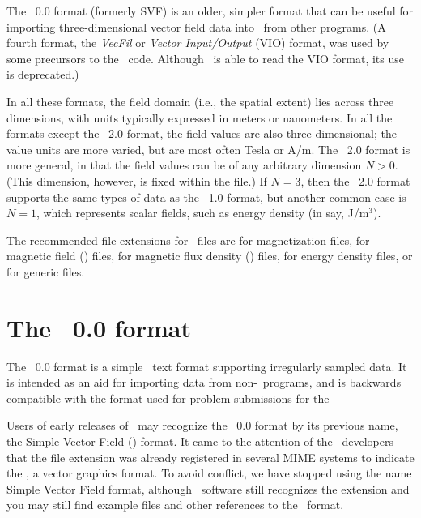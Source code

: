 The \OVF~0.0 format (formerly SVF)
is an older, simpler format that can be useful for importing
three-dimensional vector
field data into \OOMMF\ from other programs.  (A fourth format, the
\textit{VecFil} or \textit{Vector Input/Output}
(VIO) format, was used by some precursors to the \OOMMF\
code.  Although \OOMMF\ is able to read the VIO format, its use is
deprecated.)

In all these formats, the field domain (i.e., the spatial extent) lies
across three dimensions, with units typically expressed in meters or
nanometers.  In all the formats except the \OVF~2.0 format, the field
values are also three dimensional; the value units are more varied, but
are most often Tesla or A/m.  The \OVF~2.0 format is more general, in
that the field values can be of any arbitrary dimension $N>0$.  (This
dimension, however, is fixed within the file.)  If $N=3$, then the
\OVF~2.0 format supports the same types of data as the \OVF~1.0
format, but another common case is $N=1$, which represents scalar
fields, such as energy density (in say, J/m${}^3$).

The recommended file extensions for \OVF\ files are  for
magnetization files, \fn{.ohf} for magnetic field (\vH) files, 
for magnetic flux density (\vB) files,  \fn{.oef} for energy density
files, or \fn{.ovf} for generic files.

\section{The \OVF\ 0.0 format}\label{sec:svfformat}
The \OVF\ 0.0 format is a simple \ASCII\ text
format supporting irregularly sampled data.  It is intended as an aid
for importing data from non-\OOMMF\ programs, and is backwards
compatible with the format used for problem submissions for the

Users of early releases of \OOMMF\ may recognize the \OVF\ 0.0 format
by its previous name, the Simple Vector Field (\SVF)\index{file!svf}
format.  It came to the attention of the \OOMMF\ developers that the
file extension \fn{.svf} was already registered in several MIME systems
to indicate the
,
a vector graphics format.  To avoid conflict, we have stopped using
the name Simple Vector Field format, although \OOMMF\ software still
recognizes the \fn{.svf} extension and you may still find example
files and other references to the \SVF\ format.

